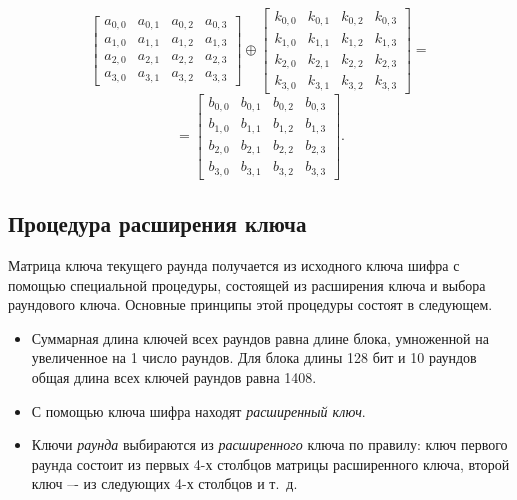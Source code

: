 \[
    \left[ \begin{array}{cccc}
        a_{0,0} & a_{0,1} & a_{0,2} & a_{0,3} \\
        a_{1,0} & a_{1,1} & a_{1,2} & a_{1,3} \\
        a_{2,0} & a_{2,1} & a_{2,2} & a_{2,3} \\
        a_{3,0} & a_{3,1} & a_{3,2} & a_{3,3}
    \end{array} \right]
    \oplus
    \left[ \begin{array}{cccc}
        k_{0,0} & k_{0,1} & k_{0,2} & k_{0,3} \\
        k_{1,0} & k_{1,1} & k_{1,2} & k_{1,3} \\
        k_{2,0} & k_{2,1} & k_{2,2} & k_{2,3} \\
        k_{3,0} & k_{3,1} & k_{3,2} & k_{3,3}
    \end{array} \right] =
\] \[
    = \left[ \begin{array}{cccc}
        b_{0,0} & b_{0,1} & b_{0,2} & b_{0,3} \\
        b_{1,0} & b_{1,1} & b_{1,2} & b_{1,3} \\
        b_{2,0} & b_{2,1} & b_{2,2} & b_{2,3} \\
        b_{3,0} & b_{3,1} & b_{3,2} & b_{3,3}
    \end{array} \right].
\]


\subsection{Процедура расширения ключа}

Матрица ключа текущего раунда получается из исходного ключа шифра с помощью специальной процедуры, состоящей из расширения ключа и выбора раундового ключа. Основные принципы этой процедуры состоят в следующем.
\begin{itemize}
    \item Суммарная длина ключей всех раундов равна длине блока, умноженной на увеличенное на 1 число раундов. Для блока длины 128 бит и 10 раундов общая длина всех ключей раундов равна 1408.
    \item С помощью ключа шифра находят \textit{расширенный ключ}.
    \item Ключи \emph{раунда} выбираются из \emph{расширенного} ключа по правилу: ключ первого раунда состоит из первых 4-х столбцов матрицы расширенного ключа, второй ключ –- из следующих 4-х столбцов и т.~д.
\end{itemize}

